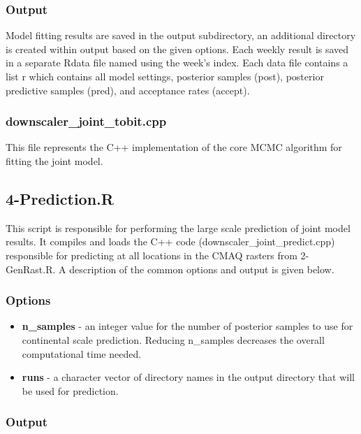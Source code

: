 \documentclass[11pt]{article}
\begin{document}
\subsubsection{Output}

Model fitting results are saved in the output subdirectory, an additional directory is created within output based on the given options. Each weekly result is saved in a separate Rdata file named using the week's index. Each data file contains a list r which contains all model settings, posterior samples (post), posterior predictive samples (pred), and acceptance rates (accept).

\subsubsection{downscaler\_joint\_tobit.cpp}

This file represents the C++ implementation of the core MCMC algorithm for fitting the joint model.

\subsection{4-Prediction.R}

This script is responsible for performing the large scale prediction of joint model results. It compiles and loads the C++ code (downscaler\_joint\_predict.cpp) responsible for predicting at all locations in the CMAQ rasters from 2-GenRast.R. A description of the common options and output is given below.

\subsubsection{Options}
\begin{itemize}

\item \textbf{n\_samples} - an integer value for the number of posterior samples to use for continental scale prediction. Reducing n\_samples decreases the overall computational time needed.

\item \textbf{runs} - a character vector of directory names in the output directory that will be used for prediction.

\end{itemize}

\subsubsection{Output}
\end{document}
